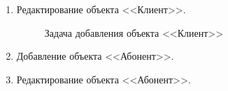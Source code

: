 \begin{enumerate}
\begin{enumerate}
        \item Редактирование объекта <<Клиент>>.
        \begin{figure}[H]
            \label{fig:client-editing-task}
            \caption{Задача добавления объекта <<Клиент>>}
        \end{figure}

        \item Добавление объекта <<Абонент>>.
        
        \item Редактирование объекта <<Абонент>>.
    \end{enumerate}
\end{enumerate}